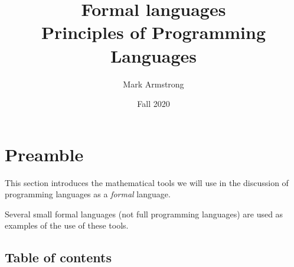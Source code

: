 \documentclass[11pt]{article}
\author{Mark Armstrong}
\date{Fall 2020}
\title{Formal languages\\\medskip
\large Principles of Programming Languages}
\theoremstyle{definition}
\begin{document}
\maketitle

\section{Preamble}
\label{sec:orgc8be8c3}
This section introduces the mathematical tools
we will use in the discussion of programming languages
as a \emph{formal} language.

Several small formal languages (not full programming languages)
are used as examples of the use of these tools.

\subsection{Table of contents}
\label{sec:orge311e4f}
\end{document}
